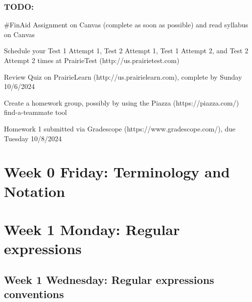 \begin{itemize}

\end{itemize}

\subsubsection*{TODO:}
\begin{list}{\itemsep-10pt}
   \item \#FinAid Assignment on Canvas (complete as soon as possible) and read syllabus on Canvas
   \item Schedule your Test 1 Attempt 1, Test 2 Attempt 1, Test 1 Attempt 2, and Test 2 Attempt 2 times 
   at PrairieTest (http://us.prairietest.com)
   \item Review Quiz on PrairieLearn (http://us.prairielearn.com), complete by Sunday 10/6/2024
   \item Create a homework group, possibly by using the Piazza (https://piazza.com/) find-a-teammate tool
   \item Homework 1 submitted via Gradescope (https://www.gradescope.com/), due Tuesday 10/8/2024
\end{list}

\newpage

\section*{Week 0 Friday: Terminology and Notation}


    
\newpage

\section*{Week 1 Monday: Regular expressions}


    
\newpage

\subsection*{Week 1 Wednesday: Regular expressions conventions}


